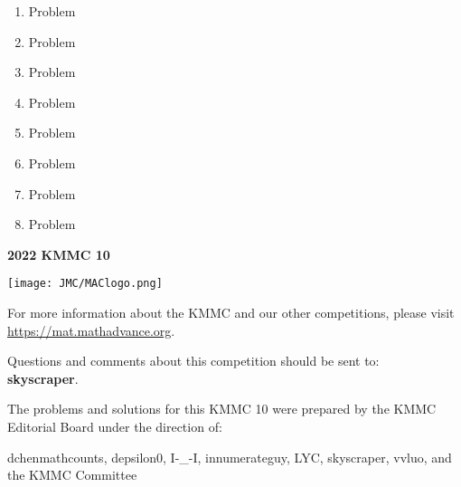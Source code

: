 \documentclass[10pt, twoside]{article}
\newcommand{\theYear}{2022}
\newcommand{\contestNumber}{10}
\newcommand{\contestName}{KMMC}
\newcommand{\committeeName}{KMMC Committee}
\begin{document}
\begin{justify}
\begin{enumerate}[itemsep=3.76389mm]
\ans{}{}{}{}{}

\item Problem

\ans{}{}{}{}{}

\item Problem

\ans{}{}{}{}{}

\item Problem

\ans{}{}{}{}{}

\item Problem

\ans{}{}{}{}{}

\item Problem

\ans{}{}{}{}{}

\item Problem

\ans{}{}{}{}{}

\item Problem

\ans{}{}{}{}{}

\item Problem

\ans{}{}{}{}{}
\end{enumerate}

\newpage
\thispagestyle{empty}
\begin{center}\textsf{\textbf{\huge {\theYear} {\contestName} {\contestNumber}}} \end{center}
\vspace{-6mm}
\begin{center} \noindent\hrulefill \end{center}
\vspace{-3mm}
\begin{center} \texttt{[image: JMC/MAClogo.png]}
\end{center}
\vspace{-5mm}
\begin{center}
For more information about the {\contestName} and our other competitions, please visit \url{https://mat.mathadvance.org}. 
\end{center}
\begin{center} Questions and comments about this competition should be sent to:  
\vspace{4mm}
\\ \textbf{skyscraper}.\end{center}
\begin{center}The problems and solutions for this {\contestName} {\contestNumber} were prepared by the {\contestName} Editorial Board under the direction of:\end{center}
\vspace{-3.5mm}
\begin{center}
dchenmathcounts, depsilon0, I-\_-I, innumerateguy, LYC, skyscraper, vvluo,
and the {\committeeName}\end{center}
\end{justify}
\end{document}
